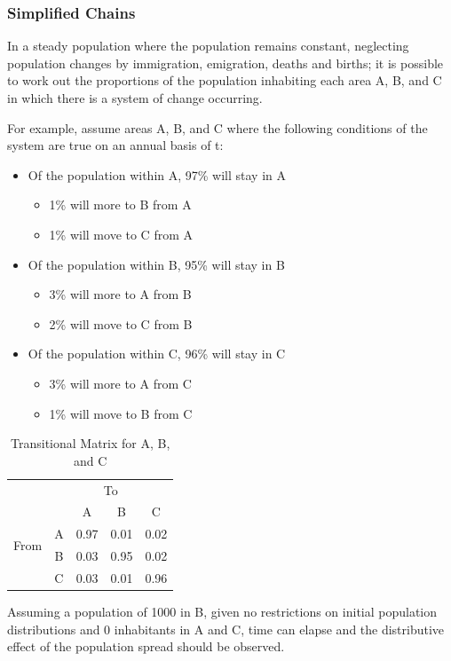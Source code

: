 \documentclass[12pt]{article}
\begin{document}
\subsubsection{Simplified Chains}
In a steady population where the population remains constant, neglecting population changes by immigration, emigration, deaths and births; it is possible to work out the proportions of the population inhabiting each area A, B, and C in which there is a system of change occurring.

For example, assume areas A, B, and C where the following conditions of the system are true on an annual basis of t:
\begin{itemize}
\item Of the population within A, 97\% will stay in A
\begin{itemize}
\item 1\% will more to B from A
\item 1\% will move to C from A
\end{itemize}
\item Of the population within B, 95\% will stay in B
\begin{itemize}
\item 3\% will more to A from B
\item 2\% will move to C from B
\end{itemize}
\item Of the population within C, 96\% will stay in C
\begin{itemize}
\item 3\% will more to A from C
\item 1\% will move to B from C
\end{itemize}
\end{itemize}

\begin{table}[h]
\centering
\begin{tabular}{ccccc}
                      & \multicolumn{4}{c}{To} \\
\multirow{4}{*}{From} &   & A    & B    & C    \\
                      & A & 0.97 & 0.01 & 0.02 \\
                      & B & 0.03 & 0.95 & 0.02 \\
                      & C & 0.03 & 0.01 & 0.96
\end{tabular}
\caption{Transitional Matrix for A, B, and C}
\end{table}

Assuming a population of 1000 in B, given no restrictions on initial population distributions and 0 inhabitants in A and C, time can elapse and the distributive effect of the population spread should be observed.
\end{document}
